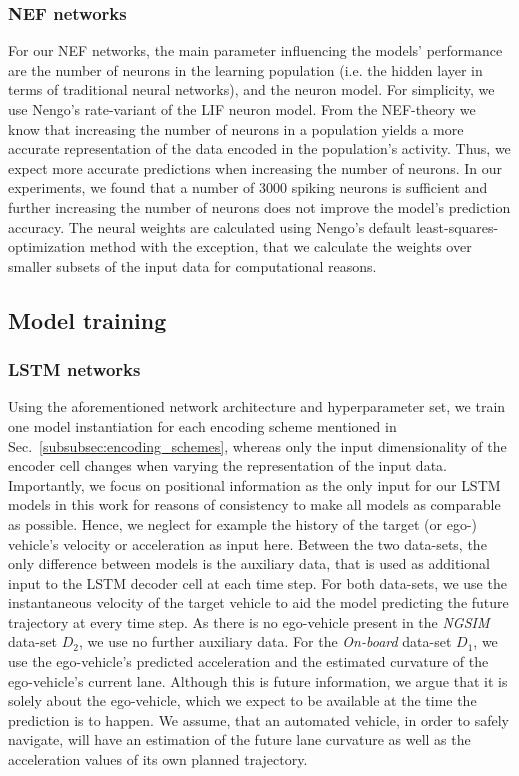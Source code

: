 \subsubsection{\ac{NEF} networks}
\label{subsubsec:hyperparam_nef}

For our \ac{NEF} networks, the main parameter influencing the models' performance are the number of neurons in the learning population (i.e. the hidden layer in terms of traditional neural networks), and the neuron model.
For simplicity, we use \acs{Nengo}'s rate-variant of the \ac{LIF} neuron model.
From the \ac{NEF}-theory \cite{Eliasmith2003} we know that increasing the number of neurons in a population yields a more accurate representation of the data encoded in the population's activity.
Thus, we expect more accurate predictions when increasing the number of neurons.
In our experiments, we found that a number of \num{3000} spiking neurons is sufficient and further increasing the number of neurons does not improve the model's prediction accuracy.
The neural weights are calculated using \acs{Nengo}'s default least-squares-optimization method with the exception, that we calculate the weights over smaller subsets of the input data for computational reasons.

\subsection{Model training}
\label{subsec:model_train}
\subsubsection{\ac{LSTM} networks}
\label{subsubsec:train_lstm}

Using the aforementioned network architecture and hyperparameter set, we train one model instantiation for each encoding scheme mentioned in Sec.~\ref{subsubsec:encoding_schemes}, whereas only the input dimensionality of the encoder cell changes when varying the representation of the input data.
Importantly, we focus on positional information as the only input for our \ac{LSTM} models in this work for reasons of consistency to make all models as comparable as possible.
Hence, we neglect for example the history of the target (or ego-) vehicle's velocity or acceleration as input here.
Between the two data-sets, the only difference between models is the auxiliary data, that is used as additional input to the \ac{LSTM} decoder cell at each time step.
For both data-sets, we use the instantaneous velocity of the target vehicle to aid the model predicting the future trajectory at every time step.
As there is no ego-vehicle present in the \emph{\ac{NGSIM}} data-set $D_2$, we use no further auxiliary data.
For the \emph{On-board} data-set $D_1$, we use the ego-vehicle's predicted acceleration and the estimated curvature of the ego-vehicle's current lane.
Although this is future information, we argue that it is solely about the ego-vehicle, which we expect to be available at the time the prediction is to happen.
We assume, that an automated vehicle, in order to safely navigate, will have an estimation of the future lane curvature as well as the acceleration values of its own planned trajectory.


